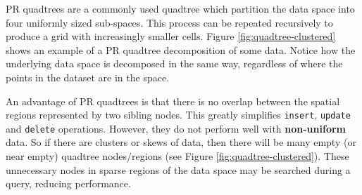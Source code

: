 PR quadtrees are a commonly used quadtree which partition the data space into four uniformly sized sub-spaces. This process can be repeated recursively to produce a grid with increasingly smaller cells. Figure \ref{fig:quadtree-clustered} shows an example of a PR quadtree decomposition of some data. Notice how the underlying data space is decomposed in the same way, regardless of where the points in the dataset are in the space.

An advantage of PR quadtrees is that there is no overlap between the spatial regions represented by two sibling nodes. This greatly simplifies \texttt{insert}, \texttt{update} and \texttt{delete} operations. However, they do not perform well with \textbf{non-uniform} data. So if there are clusters or skews of data, then there will be many empty (or near empty) quadtree nodes/regions (see Figure \ref{fig:quadtree-clustered}). These unnecessary nodes in sparse regions of the data space may be searched during a query, reducing performance.

